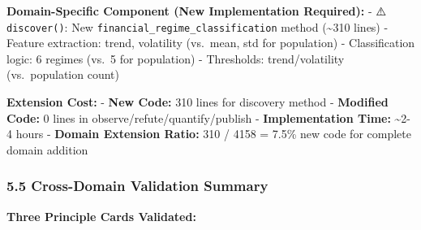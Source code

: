 \documentclass[
]{article}
\begin{document}
\textbf{Domain-Specific Component (New Implementation Required):} - ⚠️
\texttt{discover()}: New \texttt{financial\_regime\_classification}
method (\textasciitilde310 lines) - Feature extraction: trend,
volatility (vs.~mean, std for population) - Classification logic: 6
regimes (vs.~5 for population) - Thresholds: trend/volatility
(vs.~population count)

\textbf{Extension Cost:} - \textbf{New Code:} 310 lines for discovery
method - \textbf{Modified Code:} 0 lines in
observe/refute/quantify/publish - \textbf{Implementation Time:}
\textasciitilde2-4 hours - \textbf{Domain Extension Ratio:} 310 / 4158 =
7.5\% new code for complete domain addition

\subsubsection{5.5 Cross-Domain Validation
Summary}\label{cross-domain-validation-summary}

\textbf{Three Principle Cards Validated:}
\end{document}
